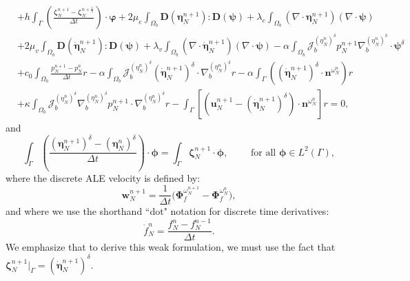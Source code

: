 \documentclass[11pt]{article}
\newcommand{\bd}{\boldsymbol}
\theoremstyle{definition}
\begin{document}
\begin{equation}
\begin{aligned}
\\
&+ h \int_{\Gamma} \left(\frac{\bd{\zeta}^{n + 1}_{N} - \bd{\zeta}^{n + \frac{1}{2}}_{N}}{\Delta t}\right) \cdot \bd{\varphi} + 2\mu_{e} \int_{\Omega_{b}} \boldsymbol{D}(\boldsymbol{\eta}^{n + 1}_{N}) : \boldsymbol{D}(\boldsymbol{\psi}) + \lambda_{e} \int_{\Omega_{b}} (\nabla \cdot \boldsymbol{\eta}^{n + 1}_{N})(\nabla \cdot \boldsymbol{\psi}) 
\\
&+ 2\mu_{v} \int_{\Omega_{b}} \bd{D}(\dot{\bd{\eta}}^{n + 1}_{N}) : \bd{D}(\bd{\psi}) + \lambda_{v} \int_{\Omega_{b}} (\nabla \cdot \dot{\bd{\eta}}^{n + 1}_{N}) (\nabla \cdot \bd{\psi}) - \alpha \int_{\Omega_{b}} \mathcal{J}^{(\eta^{n}_{N})^{\delta}}_{b} p^{n + 1}_{N} \nabla^{(\eta^{n}_{N})^{\delta}}_{b} \cdot \boldsymbol{\psi}^{\delta} 
\\
&+ c_{0}  \int_{\Omega_{b}} \frac{p^{n + 1}_{N} - p^{n}_{N}}{\Delta t} r - \alpha \int_{\Omega_{b}} \mathcal{J}^{(\eta^{n}_{N})^{\delta}}_{b} \left(\boldsymbol{\dot{\eta}}^{n + 1}_{N}\right)^{\delta} \cdot \nabla^{(\eta^{n}_{N})^{\delta}}_{b} r - \alpha \int_{\Gamma} \left(\left(\boldsymbol{\dot{\eta}}^{n + 1}_{N}\right)^{\delta} \cdot \boldsymbol{n}^{\omega^{n}_{N}}\right) r 
\\
&+ \kappa \int_{\Omega_{b}} \mathcal{J}^{(\eta^{n}_{N})^{\delta}}_{b} \nabla^{(\eta^{n}_{N})^{\delta}}_{b} p^{n + 1}_{N} \cdot \nabla^{(\eta^{n}_{N})^{\delta}}_{b} r - \int_{\Gamma} \left[\left(\boldsymbol{u}^{n + 1}_{N} - \left(\boldsymbol{\dot{\eta}}^{n + 1}_{N}\right)^{\delta}\right) \cdot \boldsymbol{n}^{\omega^{n}_{N}}\right]r = 0,
\end{aligned}
\end{equation}
and
\begin{equation}\label{weakBiot2}
\int_{\Gamma} \left(\frac{\left(\boldsymbol{\eta}^{n + 1}_{N}\right)^{\delta} - \left(\boldsymbol{\eta}^{n}_{N}\right)^{\delta}}{\Delta t} \right) \cdot \boldsymbol{\phi} = \int_{\Gamma} \bd{\zeta}^{n + 1}_{N} \cdot \boldsymbol{\phi}, \qquad \text{ for all } \boldsymbol{\phi} \in L^{2}(\Gamma),
\end{equation}
where the discrete ALE velocity is defined by:
\begin{equation}\label{aleveldisc}
\bd{w}^{n + 1}_{N} = \frac{1}{\Delta t}\Big(\bd{\Phi}^{\omega^{n + 1}_{N}}_{f} - \bd{\Phi}^{\omega^{n}_{N}}_{f}\Big),
\end{equation}
and where we use the shorthand ``dot" notation for discrete time derivatives:
\begin{equation*}
\dot{f}^{n}_{N} = \frac{f^{n}_{N} - f^{n - 1}_{N}}{\Delta t}.
\end{equation*}
We emphasize that to derive this weak formulation, we must use the fact that $\displaystyle \bd{\zeta}^{n + 1}_{N}|_{\Gamma} = (\bd{\dot{\eta}}^{n + 1}_{N})^{\delta}$. 
\end{document}
